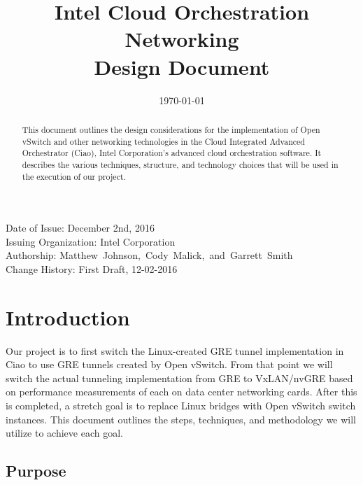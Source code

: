 \documentclass[10pt,onecolumn,journal,draftclsnofoot]{IEEEtran}
\begin{document}
\begin{titlepage}
	\title{Intel Cloud Orchestration Networking\\ Design Document}
	\date{\today}
	\maketitle
	\vspace{4cm}
	\begin{abstract}
		\noindent This document outlines the design considerations for
		the implementation of Open vSwitch and other networking
		technologies in the Cloud Integrated Advanced Orchestrator
		(Ciao), Intel Corporation's advanced cloud orchestration
		software. It describes the various techniques, structure, and
		technology choices that will be used in the execution of our
		project.
	\end{abstract}
	\vspace{6cm}
\begin{center}	
	Date of Issue: December 2nd, 2016\\
	Issuing Organization: Intel Corporation\\
	Authorship: Matthew~Johnson,~Cody~Malick,~and~Garrett~Smith\\
	Change History: First Draft, 12-02-2016 \\
\end{center}
	
\end{titlepage}
\tableofcontents
\clearpage

\section{Introduction}

Our project is to first switch the Linux-created GRE tunnel implementation in
Ciao to use GRE tunnels created by Open vSwitch. From that point we will switch
the actual tunneling implementation from GRE to VxLAN/nvGRE based on performance
measurements of each on data center networking cards. After this is completed, a
stretch goal is to replace Linux bridges with Open vSwitch switch instances.
This document outlines the steps, techniques, and methodology we will utilize to
achieve each goal.

\subsection{Purpose}
\end{document}
